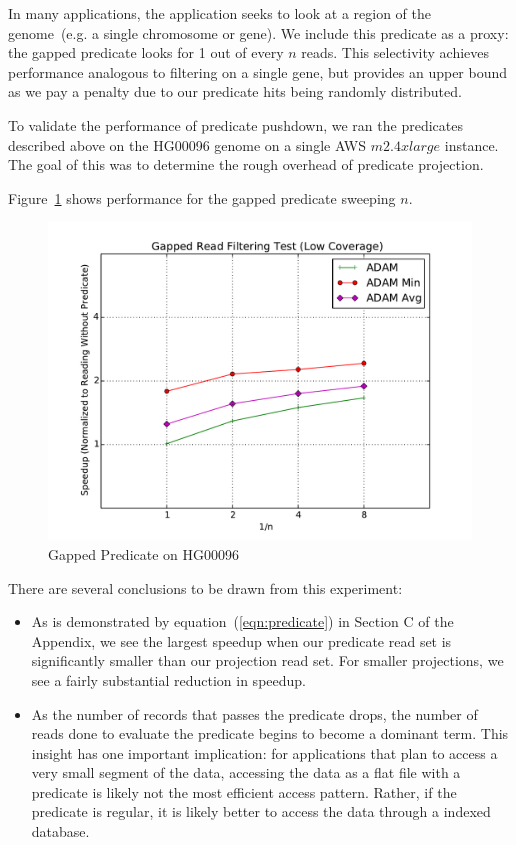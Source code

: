 \documentclass{acm_proc_article-sp}
\begin{document}
In many applications, the application seeks to look at a region of the genome~(e.g. a single chromosome or gene). We include this
predicate as a proxy: the gapped predicate looks for 1 out of every $n$ reads. This selectivity achieves performance analogous to filtering
on a single gene, but provides an upper bound as we pay a penalty due to our predicate hits being randomly distributed.

To validate the performance of predicate pushdown, we ran the predicates described above on the HG00096 genome on a
single AWS $m2.4xlarge$ instance. The goal of this was to determine the rough overhead of predicate projection.

Figure~\ref{fig:gapped-filter} shows performance for the gapped predicate sweeping $n$.

\begin{figure}[h]
\begin{center}
\includegraphics[width=\linewidth]{microbenchmarks/gapped_predicate_low_coverage.pdf}
\end{center}
\caption{Gapped Predicate on HG00096}
\label{fig:gapped-filter}
\end{figure}

There are several conclusions to be drawn from this experiment:

\begin{itemize}
\item As is demonstrated by equation~(\ref{eqn:predicate}) in Section C of the Appendix, we see the largest speedup when our predicate read set is significantly
smaller than our projection read set. For smaller projections, we see a fairly substantial reduction in speedup.
\item As the number of records that passes the predicate drops, the number of reads done to evaluate the predicate begins to become
a dominant term. This insight has one important implication: for applications that plan to access a very small segment of the data, accessing the
data as a flat file with a predicate is likely not the most efficient access pattern. Rather, if the predicate is regular, it is likely better to access
the data through a indexed database.
\end{itemize}
\end{document}
